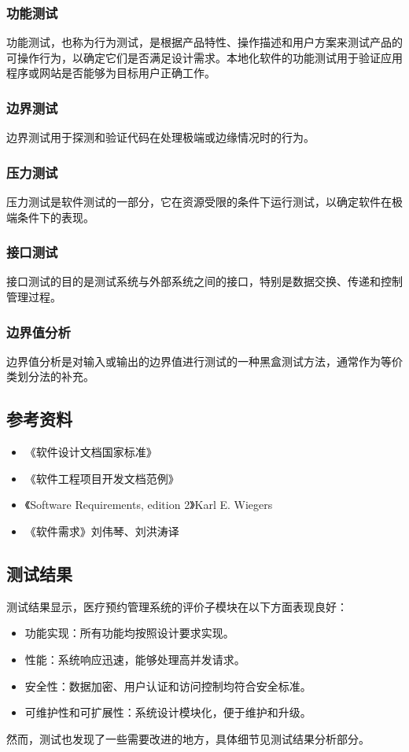 \subsubsection*{功能测试}
功能测试，也称为行为测试，是根据产品特性、操作描述和用户方案来测试产品的可操作行为，以确定它们是否满足设计需求。本地化软件的功能测试用于验证应用程序或网站是否能够为目标用户正确工作。

\subsubsection*{边界测试}
边界测试用于探测和验证代码在处理极端或边缘情况时的行为。

\subsubsection*{压力测试}
压力测试是软件测试的一部分，它在资源受限的条件下运行测试，以确定软件在极端条件下的表现。

\subsubsection*{接口测试}
接口测试的目的是测试系统与外部系统之间的接口，特别是数据交换、传递和控制管理过程。

\subsubsection*{边界值分析}
边界值分析是对输入或输出的边界值进行测试的一种黑盒测试方法，通常作为等价类划分法的补充。

\subsection{参考资料}
\begin{itemize}
	\item 《软件设计文档国家标准》
	\item 《软件工程项目开发文档范例》
	\item 《Software Requirements, edition 2》Karl E. Wiegers
	\item 《软件需求》刘伟琴、刘洪涛译
\end{itemize}

\subsection{测试结果}
测试结果显示，医疗预约管理系统的评价子模块在以下方面表现良好：
\begin{itemize}
	\item 功能实现：所有功能均按照设计要求实现。
	\item 性能：系统响应迅速，能够处理高并发请求。
	\item 安全性：数据加密、用户认证和访问控制均符合安全标准。
	\item 可维护性和可扩展性：系统设计模块化，便于维护和升级。
\end{itemize}
然而，测试也发现了一些需要改进的地方，具体细节见测试结果分析部分。